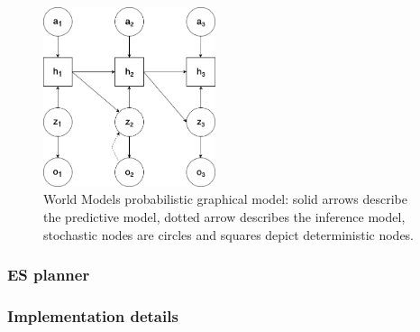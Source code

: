 \begin{figure}[H]
\includegraphics[width=0.45\textwidth,keepaspectratio]{figures/WorldModels/prob_graph_model.png}
\caption[World Models probabilistic graphical model]{World Models probabilistic graphical model: solid arrows describe the predictive model, dotted arrow describes the inference model, stochastic nodes are circles and squares depict deterministic nodes.}
\label{Fig.WorldModelsPGM}
\end{figure}

\subsubsection{ES planner}


\subsubsection{Implementation details}

